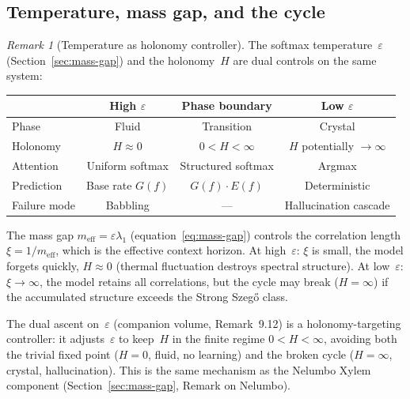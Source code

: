\documentclass[11pt,a4paper]{article}
\theoremstyle{definition}
\theoremstyle{remark}
\newtheorem{remark}[theorem]{Remark}
\begin{document}
\subsection*{Temperature, mass gap, and the cycle}

\begin{remark}[Temperature as holonomy controller]
\label{rmk:temperature-holonomy}
The softmax temperature~$\varepsilon$
(Section~\ref{sec:mass-gap}) and the holonomy~$H$ are dual
controls on the same system:

\begin{center}
\small
\begin{tabular}{@{}lccc@{}}
\toprule
& \textbf{High $\varepsilon$}
& \textbf{Phase boundary}
& \textbf{Low $\varepsilon$} \\
\midrule
Phase & Fluid & Transition & Crystal \\
Holonomy & $H \approx 0$ & $0 < H < \infty$ & $H$ potentially $\to \infty$ \\
Attention & Uniform softmax & Structured softmax & Argmax \\
Prediction & Base rate $G(f)$ & $G(f) \cdot E(f)$ & Deterministic \\
Failure mode & Babbling & --- & Hallucination cascade \\
\bottomrule
\end{tabular}
\end{center}

\noindent
The mass gap $m_{\mathrm{eff}} = \varepsilon\lambda_1$
(equation~\eqref{eq:mass-gap}) controls the correlation length
$\xi = 1/m_{\mathrm{eff}}$, which is the effective context
horizon.
At high~$\varepsilon$: $\xi$ is small, the model forgets quickly,
$H \approx 0$ (thermal fluctuation destroys spectral structure).
At low~$\varepsilon$: $\xi \to \infty$, the model retains all
correlations, but the cycle may break ($H = \infty$) if the
accumulated structure exceeds the Strong Szeg\H{o} class.

The dual ascent on~$\varepsilon$ (companion volume,
Remark~9.12) is a holonomy-targeting controller:
it adjusts~$\varepsilon$ to keep~$H$ in the finite regime
$0 < H < \infty$, avoiding both the trivial fixed point
($H = 0$, fluid, no learning) and the broken cycle
($H = \infty$, crystal, hallucination).
This is the same mechanism as the Nelumbo Xylem component
(Section~\ref{sec:mass-gap}, Remark on Nelumbo).
\end{remark}
\end{document}
